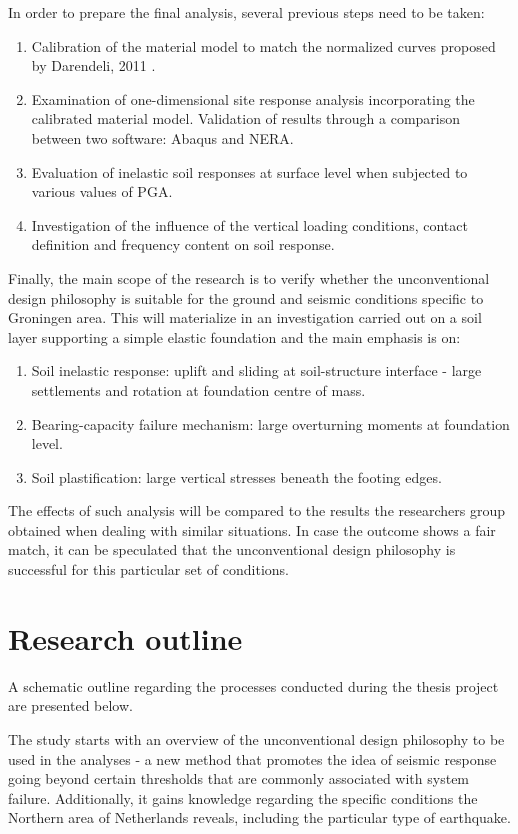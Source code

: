 \documentclass[11pt,a4paper]{report}
\begin{document}
In order to prepare the final analysis, several previous steps need to be taken:
\begin{enumerate}
	\item Calibration of the material model to match the normalized curves proposed by Darendeli, 2011 \cite{darendeli2001development}.
	\item Examination of one-dimensional site response analysis incorporating the calibrated material model. Validation of results through a comparison between two software: Abaqus and NERA.
	\item Evaluation of inelastic soil responses at surface level when subjected to various values of PGA.
	\item Investigation of the influence of the vertical loading conditions, contact definition and frequency content on soil response.
\end{enumerate}

Finally, the main scope of the research is to verify whether the unconventional design philosophy is suitable for the ground and seismic conditions specific to Groningen area. This will materialize in an investigation carried out on a soil layer supporting a simple elastic foundation and the main emphasis is on:

\begin{enumerate}
	\item Soil inelastic response: uplift and sliding at soil-structure interface - large settlements and rotation at foundation centre of mass. 
	\item Bearing-capacity failure mechanism: large overturning moments at foundation level.
	\item Soil plastification: large vertical stresses beneath the footing edges.
\end{enumerate}

The effects of such analysis will be compared to the results the researchers group obtained when dealing with similar situations. In case the outcome shows a fair match, it can be speculated that the unconventional design philosophy is successful for this particular set of conditions.

\section{Research outline}
A schematic outline regarding the processes conducted during the thesis project are presented below. 

The study starts with an overview of the unconventional design philosophy to be used in the analyses - a new method that promotes the idea of seismic response going beyond certain thresholds that are commonly associated with system failure. Additionally, it gains knowledge regarding the specific conditions the Northern area of Netherlands reveals, including the particular type of earthquake.
\end{document}

